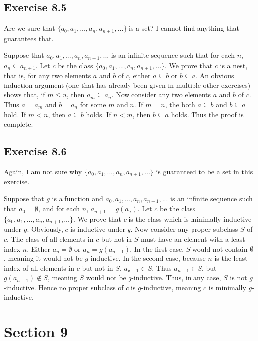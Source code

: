 \documentclass{article}
\theoremstyle{definition}
\begin{document}
\subsection*{Exercise 8.5}
Are we sure that $\{a_0,a_1,...,a_n,a_{n+1},...\}$ is a set? I cannot find anything that guarantees that.

Suppose that $a_0,a_1,...,a_n,a_{n+1},...$ is an infinite sequence such that for each $n$, $a_n\subseteq a_{n+1}$. Let $c$ be the class 
$\{a_0,a_1,...,a_n,a_{n+1},...\}$. We prove that $c$ is a nest, that is, for any two elements $a$ and $b$ of $c$, either $a\subseteq b$ or $b\subseteq a$. An obvious induction argument (one 
that has already been given in multiple other exercises) shows that, if $m\le n$, then $a_m\subseteq a_n$. Now consider any two elements $a$ and $b$ of $c$. Thus 
$a=a_m$ and $b=a_n$ for some $m$ and $n$. If $m=n$, the both $a\subseteq b$ and $b\subseteq a$ hold. If $m<n$, then $a\subseteq b$ holds. If $n<m$, then $b\subseteq a$ holds. Thus the proof is 
complete.

\subsection*{Exercise 8.6}
Again, I am not sure why $\{a_0,a_1,...,a_n,a_{n+1},...\}$ is guaranteed to be a set in this exercise.

Suppose that $g$ is a function and $a_0,a_1,...,a_n,a_{n+1},...$ is an infinite sequence such that $a_0=\emptyset$, and for each $n$, $a_{n+1}=g(a_n)$. 
Let $c$ be the class $\{a_0,a_1,...,a_n,a_{n+1},...\}$. We prove that $c$ is the class which is minimally inductive under $g$. Obviously, $c$ is inductive under $g$. Now consider any proper subclass 
$S$ of $c$. The class of all elements in $c$ but not in $S$ must have an element with a least index $n$. 
Either $a_n=\emptyset$ or $a_n=g(a_{n-1})$. In the first case, $S$ would not contain $\emptyset$, meaning it would not be $g$-inductive. In the second case, because $n$ is the least index 
of all elements in $c$ but not in $S$, $a_{n-1}\in S$. Thus $a_{n-1}\in S$, but $g(a_{n-1})\notin S$, meaning $S$ would not be $g$-inductive. Thus, in any case, $S$ is not $g$-inductive. Hence
no proper subclass of $c$ is $g$-inductive, meaning $c$ is minimally $g$-inductive.

\section*{Section 9}
\end{document}
